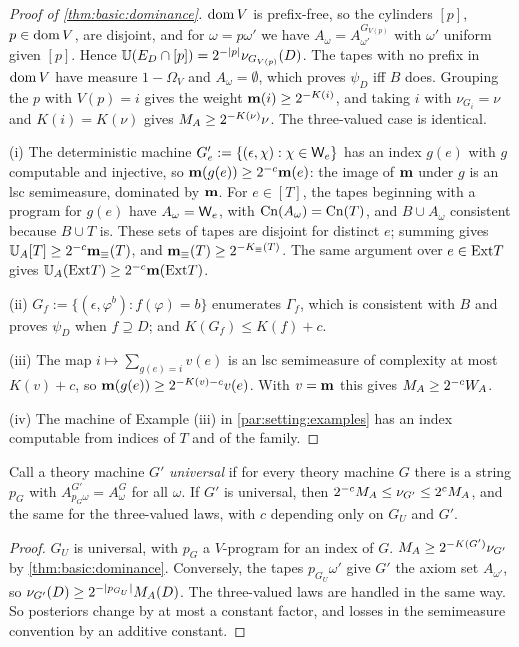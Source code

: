 \begin{proof}[Proof of \cref{thm:basic:dominance}]
$\operatorname{dom} V$ is prefix-free, so the cylinders $[p]$, $p\in\operatorname{dom} V$, are disjoint, and for $\omega=p\omega'$ we have $A_\omega=A^{G_{V(p)}}_{\omega'}$ with $\omega'$ uniform given $[p]$. Hence $\mathbb{U}(E_D\cap[p])=2^{-\lvert p\rvert}\nu_{G_{V(p)}}(D)$. The tapes with no prefix in $\operatorname{dom} V$ have measure $1-\Omega_V$ and $A_\omega=\emptyset$, which proves $\psi_D$ iff $B$ does. Grouping the $p$ with $V(p)=i$ gives the weight $\mathbf{m}(i)\ge2^{-K(i)}$, and taking $i$ with $\nu_{G_i}=\nu$ and $K(i)=K(\nu)$ gives $M_{A}\ge2^{-K(\nu)}\nu$. The three-valued case is identical.

(i) The deterministic machine $G'_e:=\{(\epsilon,\chi):\chi\in\mathsf{W}_{e}\}$ has an index $g(e)$ with $g$ computable and injective, so $\mathbf{m}(g(e))\ge2^{-c}\mathbf{m}(e)$: the image of $\mathbf{m}$ under $g$ is an lsc semimeasure, dominated by $\mathbf{m}$. For $e\in[T]$, the tapes beginning with a program for $g(e)$ have $A_\omega=\mathsf{W}_{e}$, with $\mathrm{Cn}(A_\omega)=\mathrm{Cn}(T)$, and $B\cup A_\omega$ consistent because $B\cup T$ is. These sets of tapes are disjoint for distinct $e$; summing gives $\mathbb{U}_{A}[T]\ge2^{-c}\mathbf{m}_{\equiv}(T)$, and $\mathbf{m}_{\equiv}(T)\ge2^{-K_{\equiv}(T)}$. The same argument over $e\in\mathrm{Ext} T$ gives $\mathbb{U}_{A}(\mathrm{Ext} T)\ge2^{-c}\mathbf{m}(\mathrm{Ext} T)$.

(ii) $G_f:=\{(\epsilon,\varphi^b):f(\varphi)=b\}$ enumerates $\Gamma_f$, which is consistent with $B$ and proves $\psi_D$ when $f\supseteq D$; and $K(G_f)\le K(f)+c$.

(iii) The map $i\mapsto\sum_{g(e)=i}v(e)$ is an lsc semimeasure of complexity at most $K(v)+c$, so $\mathbf{m}(g(e))\ge2^{-K(v)-c}v(e)$. With $v=\mathbf{m}$ this gives $M_{A}\ge2^{-c}W_{A}$.

(iv) The machine of Example (iii) in \cref{par:setting:examples} has an index computable from indices of $T$ and of the family.
\end{proof}

\begin{proposition}\label{prop:basic:invariance}
Call a theory machine $G'$ \emph{universal} if for every theory machine $G$ there is a string $p_G$ with $A^{G'}_{p_G\omega}=A^G_\omega$ for all $\omega$. If $G'$ is universal, then $2^{-c}M_{A}\le\nu_{G'}\le2^cM_{A}$, and the same for the three-valued laws, with $c$ depending only on $G_U$ and $G'$.
\end{proposition}

\begin{proof}
$G_U$ is universal, with $p_G$ a $V$-program for an index of $G$. $M_{A}\ge2^{-K(G')}\nu_{G'}$ by \cref{thm:basic:dominance}. Conversely, the tapes $p_{G_U}\omega'$ give $G'$ the axiom set $A_{\omega'}$, so $\nu_{G'}(D)\ge2^{-\lvert p_{G_U}\rvert}M_{A}(D)$. The three-valued laws are handled in the same way. So posteriors change by at most a constant factor, and losses in the semimeasure convention by an additive constant.
\end{proof}

